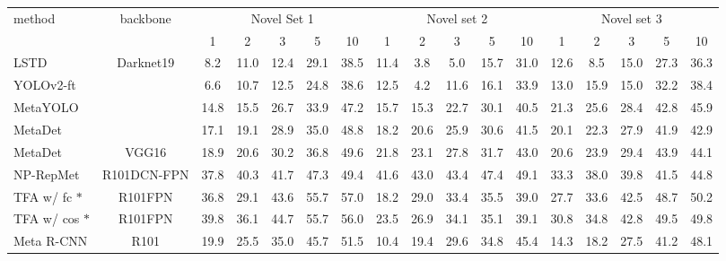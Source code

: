 \documentclass[10pt,twocolumn,letterpaper]{article}
\begin{document}
\begin{table*}
\begin{center}
\setlength\tabcolsep{1.8pt}
\begin{tabular}{|l|c|| c|c|c|c|c|| c|c|c|c|c|| c|c|c|c|c|}
\hline
\multirow{2}{*}{method} & \multirow{2}{*}{backbone} & \multicolumn{5}{c|}{Novel Set 1} & \multicolumn{5}{c|}{Novel set 2} & \multicolumn{5}{c|}{Novel set 3} \\ \cline{3-17} 
  &  &  1 & 2 & 3 & 5 & 10 & 1 & 2 & 3 & 5 & 10 & 1 & 2 & 3 & 5 & 10 \\
\hline\hline
    LSTD   \cite{chen2018lstd}     & \multirow{4}{*}{Darknet19 } & 8.2 & 11.0 & 12.4 & 29.1 & 38.5 & 11.4 & 3.8 & 5.0 & 15.7 & 31.0 & 12.6 & 8.5 & 15.0 & 27.3 & 36.3 \\    
    YOLOv2-ft \cite{kang2019few}  &  & 6.6 & 10.7 & 12.5 & 24.8 & 38.6 & 12.5 & 4.2 & 11.6 & 16.1 & 33.9 & 13.0 & 15.9 & 15.0 & 32.2 & 38.4 \\    
    MetaYOLO  \cite{kang2019few}  &  &14.8 & 15.5 & 26.7 & 33.9 & 47.2 & 15.7 &15.3 &22.7 &30.1 &40.5 &21.3 &25.6 &28.4&42.8 &45.9 \\    
    MetaDet  \cite{wang2019meta}   &  &17.1 & 19.1 & 28.9 & 35.0 & 48.8 & 18.2 &20.6 &25.9 &30.6 &41.5 &20.1 &22.3 &27.9& 41.9 &42.9 \\ \hline
    MetaDet  \cite{wang2019meta}    & VGG16 \cite{simonyan2014very} &18.9 & 20.6 & 30.2 & 36.8 & 49.6 & 21.8 &23.1 &27.8 &31.7 &43.0 &20.6 & 23.9 & 29.4 & 43.9 &44.1 \\
NP-RepMet \cite{yang2020restoring}     & R101DCN-FPN    & 37.8 & 40.3 & 41.7 & 47.3 & 49.4 & 41.6 & 43.0 & 43.4 & 47.4 & 49.1 & 33.3 & 38.0 & 39.8 & 41.5  & 44.8 \\
    TFA w/ fc $\ast$ \cite{wang2020frustratingly} & R101FPN     & 36.8 & 29.1 & 43.6 & 55.7 & 57.0 & 18.2 & 29.0 & 33.4 & 35.5 & 39.0 & 27.7 & 33.6 & 42.5 &  48.7 & 50.2\\
    TFA w/ cos $\ast$ \cite{wang2020frustratingly} & R101FPN     & 39.8 & 36.1 & 44.7 & 55.7 & 56.0 & 23.5 & 26.9 & 34.1 & 35.1 & 39.1 & 30.8 & 34.8 & 42.8 &  49.5 & 49.8\\
Meta R-CNN \cite{yan2019meta}     & R101      &19.9 & 25.5 & 35.0 & 45.7 & 51.5 & 10.4 &19.4 &29.6 &34.8 &45.4 &14.3 &18.2 &27.5&41.2 &48.1 \\
    

\end{tabular}
\end{center}
\end{table*}
\end{document}

